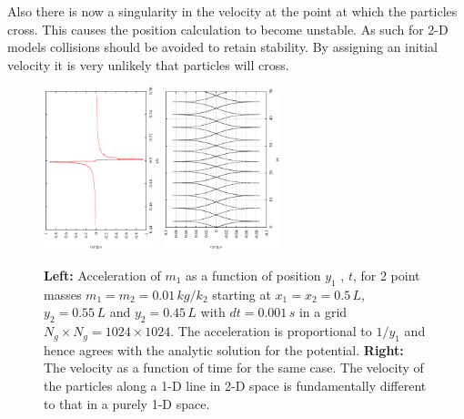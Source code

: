 \documentclass[10pt,a4paper]{article}
\begin{document}
Also there is now a singularity in the velocity at the point at which the particles cross. This causes the position calculation to become unstable. As such for 2-D models collisions should be avoided to retain stability. By assigning an initial velocity it is very unlikely that particles will cross.

\begin{figure}[h!]
\begin{center}
\includegraphics[width =0.3\textwidth, angle =-90]{accPhase2d.eps}
\includegraphics[width =0.3\textwidth, angle =-90]{vel2D.eps}
\caption{\textbf{Left: }Acceleration of $m_1$ as a function of position $y_1$ , $t$, for 2 point masses $m_1 = m_2 = 0.01\, kg/k_2$ starting at $x_1 = x_2 =0.5 \,L$, $y_2= 0.55\,L$ and $y_2=0.45\,L$ with $dt=0.001\,s$ in a grid $N_g\times N_g = 1024\times 1024$. The acceleration is proportional to $1/y_1$ and hence agrees with the analytic solution for the potential. \textbf{Right: }The velocity as a function of time for the same case. The velocity of the particles along a 1-D line in 2-D space is fundamentally different to that in a purely 1-D space.}
\label{fig:1Din2D}
\end{center}
\end{figure}
\newpage
\end{document}
